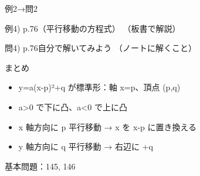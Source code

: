 \documentclass[aspectratio=43,professionalfonts,handout]{beamer}
\begin{document}
\begin{frame}{例2→問2}
  \begin{exampleblock}{例4) p.76（平行移動の方程式）}
    （板書で解説）
  \end{exampleblock}

  \vfill

  \begin{block}{問4) p.76\quad 自分で解いてみよう}
    （ノートに解くこと）
  \end{block}
\end{frame}

\begin{frame}{まとめ}
  \begin{itemize}
    \item y=a(x-p)²+q が標準形：軸 x=p、頂点 (p,q)
    \item a>0 で下に凸、a<0 で上に凸
    \item x 軸方向に p 平行移動 → x を x-p に置き換える
    \item y 軸方向に q 平行移動 → 右辺に +q
  \end{itemize}

  \vfill
  {\small 基本問題：145, 146}
\end{frame}
\end{document}
